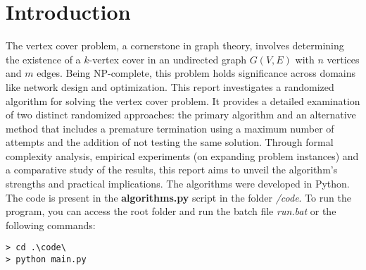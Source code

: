 \section{Introduction}

The vertex cover problem, a cornerstone in graph theory, involves determining the existence of a \( k \)-vertex cover in an undirected graph \( G(V, E) \) with \( n \) vertices and \( m \) edges. Being NP-complete, this problem holds significance across domains like network design and optimization. This report investigates a randomized algorithm for solving the vertex cover problem. It provides a detailed examination of two distinct randomized approaches: the primary algorithm and an alternative method that includes a premature termination using a maximum number of attempts and the addition of not testing the same solution.  Through formal complexity analysis, empirical experiments (on expanding problem instances) and a comparative study of the results, this report aims to unveil the algorithm's strengths and practical implications.
The algorithms were developed in Python. The code is present in the \textbf{algorithms.py} script in the folder \textit{/code}. To run the program, you can access the root folder and run the batch file \textit{run.bat} or the following commands:

\begin{verbatim}
> cd .\code\
> python main.py
\end{verbatim}